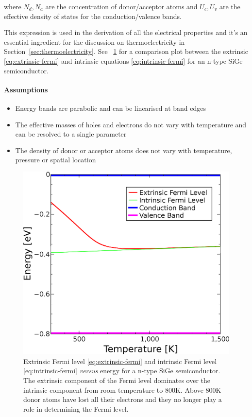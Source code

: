 \documentclass[12pt]{article}
\newcommand{\figref}[2][\figurename~]{#1\ref{#2}}
\newcommand{\secref}[2][Section~]{#1\ref{#2}}
\begin{document}
where $N_d, N_a$ are the concentration of donor/acceptor atoms and $U_c, U_v$ are the effective density of states for the conduction/valence bands.

This expression is used in the derivation of all the electrical properties and it's an essential ingredient for the discussion on thermoelectricity in \secref{sec:thermoelectricity}. See \figref{fig:fermi-level-compare} for a comparison plot between the extrinsic \eqref{eq:extrinsic-fermi} and intrinsic equations \eqref{eq:intrinsic-fermi} for an n-type SiGe semiconductor.

\paragraph{Assumptions}
\begin{itemize}
  \item Energy bands are parabolic and can be linearised at band edges
  \item The effective masses of holes and electrons do not vary with temperature and can be resolved to a single parameter
  \item The density of donor or acceptor atoms does not vary with temperature, pressure or spatial location
\end{itemize}

\begin{figure}
	\centering
	\includegraphics[width=\textwidth]{fermi-level-compare.eps}
	\caption{Extrinsic Fermi level \eqref{eq:extrinsic-fermi} and intrinsic Fermi level \eqref{eq:intrinsic-fermi} \emph{versus} energy for a n-type SiGe semiconductor. The extrinsic component of the Fermi level dominates over the intrinsic component from room temperature to 800K. Above 800K donor atoms have lost all their electrons and they no longer play a role in determining the Fermi level.}
	\label{fig:fermi-level-compare}
\end{figure}
\end{document}
